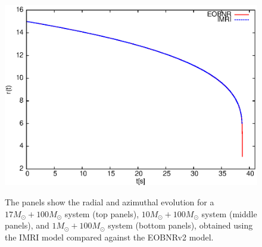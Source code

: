 \begin{figure}
{\includegraphics[height=0.38\textwidth,  clip]{figures/insimri/trim1100k}
}
\caption{The panels show the radial and azimuthal evolution for a \(17M_{\odot} + 100M_{\odot}\) system (top panels), \(10M_{\odot} + 100M_{\odot}\) system (middle panels), and \(1M_{\odot} + 100M_{\odot}\) system (bottom panels), obtained using the IMRI model compared against the EOBNRv2 model.}
\label{dv15100}
\end{figure}

